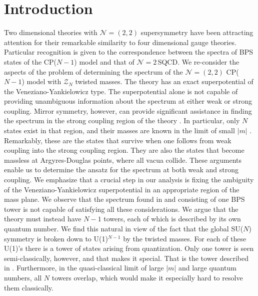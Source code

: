 \documentclass[epsfig,12pt]{article}
\newcommand{\ntwo}{${\mathcal N}=2\,$}
\newcommand{\ntwot}{${\mathcal N}= \left(2,2\right) $ }
\newcommand{\mc}[1]{\mathcal{#1}}
\begin{document}
\newpage

\section{Introduction}
\setcounter{equation}{0}

	Two dimensional theories with \ntwot supersymmetry have been attracting attention 
	for their remarkable similarity to four dimensional gauge theories.
	Particular recognition is given to the correspondence between the spectra of BPS states 
	of the CP($N-1$) model and that of \ntwo SQCD.
	We re-consider the aspects of the problem of determining the spectrum of the \ntwot CP($N-1$) model 
	with $ \mc{Z}_N $ twisted masses.
	The theory has an exact superpotential of the Veneziano-Yankielowicz type.
	The superpotential alone is not capable of providing unambiguous information about the 
	spectrum at either weak or strong coupling.
	Mirror symmetry, however, can provide significant assistance in finding the spectrum
	in the strong coupling region of the theory \cite{MR1}.
	In particular, only $ N $ states exist in that region, and their masses are known in
	the limit of small $ |m| $ \cite{Shifman:2010id}.
	Remarkably, these are the states that survive when one follows from weak coupling
	into the strong coupling region.
	They are also the states that become massless at Argyres-Douglas points,
	where all vacua collide.
	These arguments enable us to determine the ansatz for the spectrum at both weak
	and strong coupling.
	We emphasize that a crucial step in our analysis is fixing the ambiguity of the 
	Veneziano-Yankielowicz superpotential in an appropriate region of the mass plane. 
	We observe that the spectrum found in \cite{Dor} and consisting
	of one BPS tower is not capable of satisfying all these considerations.
	We argue that the theory must instead have $ N - 1 $ towers, each of which is described
	by its own quantum number.
	We find this natural in view of the fact that the global SU($N$) symmetry is broken
	down to U(1)$^{N-1}$ by the twisted masses.
	For each of these U(1)'s there is a tower of states arising from quantization.
	Only one tower is seen semi-classically, however, and that makes it special.
	That is the tower described in \cite{Dor}.
	Furthermore, in the quasi-classical limit of large $ | m | $ and large quantum numbers,
	all $ N $ towers overlap, which would make it especially hard to resolve them
	classically.
	
\end{document}
